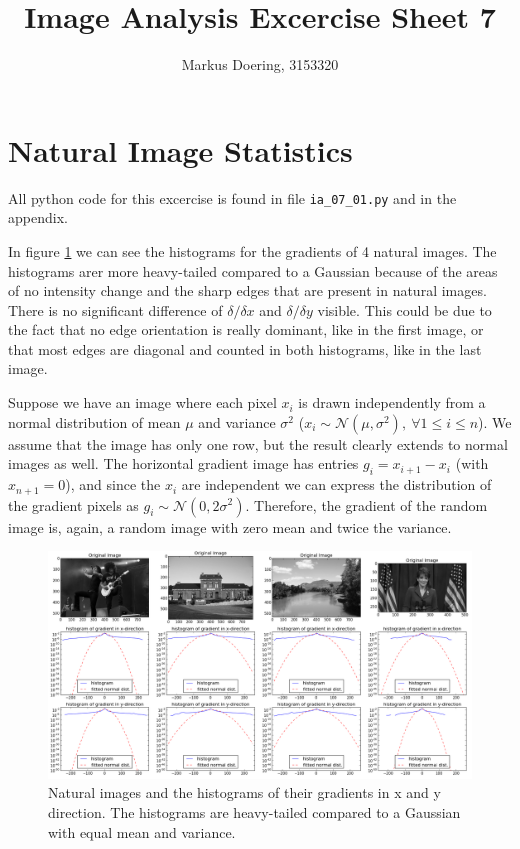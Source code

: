 \documentclass[11pt,a4paper]{scrartcl}
\begin{document}
\lstset{
    style=customc
} 

\title{Image Analysis Excercise Sheet 7}
\author{Markus Doering, 3153320}
\maketitle

\section{Natural Image Statistics}
All python code for this excercise is found in file \verb$ia_07_01.py$ and in the appendix. 

In figure \ref{fig:1} we can see the histograms for the gradients of 4 natural images. The histograms arer more heavy-tailed compared to a Gaussian because of the areas of no intensity change and the sharp edges 
that are present in natural images. There is no significant difference of $\delta/\delta x$ and $\delta/\delta y$ visible. This could be due to the fact that no edge orientation is really dominant, like in the 
first image, or that most edges are diagonal and counted in both histograms, like in the last image.

Suppose we have an image where each pixel $x_i$ is drawn independently from a normal distribution of mean $\mu$ and variance $\sigma^2$ ($x_i \sim \mathcal{N}(\mu,\sigma^2),\ \forall 1\leq i\leq n$). We assume that the image 
has only one row, but the result clearly extends to normal images as well. The horizontal gradient image has entries $g_i = x_{i+1}-x_i$ (with $x_{n+1} = 0$), and since the $x_i$ are independent we 
can express the distribution of the gradient pixels as $g_i\sim\mathcal{N}(0,2\sigma^2)$. Therefore, the gradient of the random image is, again, a random image with zero mean and twice the variance.

\begin{figure}[hb]\label{fig:1}
\includegraphics[width=.99\linewidth]{histograms_cut.png}
\caption{Natural images and the histograms of their gradients in x and y direction. The histograms are heavy-tailed compared to a Gaussian with equal mean and variance.}
\end{figure}
\end{document}
